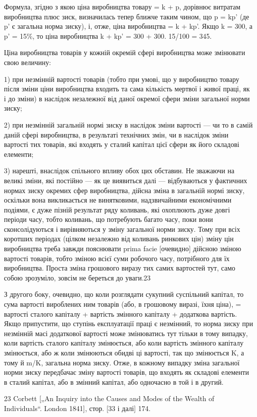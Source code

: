 Формула, згідно з якою ціна виробництва товару = k + p,
дорівнює витратам виробництва плюс зиск, визначилась тепер
ближче таким чином, що p = kp' (де p' є загальна норма зиску),
і, отже, ціна виробництва = k + kp'. Якщо k = 300, а p' = 15\%,
то ціна виробництва k + kp' = 300 + 300. 15/100 = 345.

Ціна виробництва товарів у кожній окремій сфері виробництва може змінювати свою величину:

1) при незмінній вартості товарів (тобто при умові, що у виробництво товару після зміни ціни
виробництва входить та сама
кількість мертвої і живої праці, як і до зміни) в наслідок незалежної від даної окремої сфери зміни
загальної норми зиску;

2) при незмінній загальній нормі зиску в наслідок зміни вартості — чи то в самій даній сфері
виробництва, в результаті
технічних змін, чи в наслідок зміни вартості тих товарів, які
входять у сталий капітал цієї сфери як його складові елементи;

3) нарешті, внаслідок спільного впливу обох цих обставин.
Не зважаючи на великі зміни, які постійно — як це виявиться
далі — відбуваються у фактичних нормах зиску окремих сфер
виробництва, дійсна зміна в загальній нормі зиску, оскільки
вона викликається не винятковими, надзвичайними економічними
подіями, є дуже пізній результат ряду коливань, які охоплюють
дуже довгі періоди часу, тобто коливань, що потребують багато часу, поки вони сконсолідуються і
вирівняються у зміну
загальної норми зиску. Тому при всіх коротших періодах (цілком незалежно від коливань ринкових цін)
зміну цін виробництва
треба завжди пояснювати prima facie [очевидно] дійсною зміною
вартості товарів, тобто зміною всієї суми робочого часу, потрібного для їх виробництва. Проста зміна
грошового виразу тих самих вартостей тут, само собою зрозуміло, зовсім не береться до уваги.23

З другого боку, очевидно, що коли розглядати сукупний
суспільний капітал, то сума вартості вироблених ним товарів
(або, в грошовому виразі, їхня ціна), = вартості сталого капіталу + вартість змінного капіталу +
додаткова вартість. Якщо припустити, що ступінь експлуатації праці є незмінний, то норма зиску
при незмінній масі додаткової вартості може змінюватись тут
тільки в тому випадку, коли вартість сталого капіталу змінюється,
або коли вартість змінного капіталу змінюється, або ж коли змінюються обидві ці вартості, так що
змінюється K, а тому й m/K, загальна норма зиску. Отже, в кожному випадку зміна загальної
норми зиску передбачає зміну вартості товарів, що входять як
складові елементи в сталий капітал, або в змінний капітал, або
одночасно в той і в другий.

23 Corbett [„An Inquiry into the Causes and Modes of the Wealth of Individuals“.
London 1841], стор. [33 і далі] 174.
